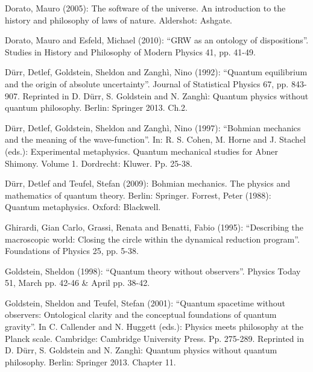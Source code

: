 \documentclass[12pt,a4paper]{article}
\theoremstyle{definition}
\begin{document}
{\vspace{0.3cm}   \noindent  Dorato, Mauro (2005): The software of the universe. An introduction to the history and philosophy of laws of nature. Aldershot: Ashgate. 

\vspace{0.3cm}   \noindent  Dorato, Mauro and Esfeld, Michael (2010): ``GRW as an ontology of dispositions''. Studies in History and Philosophy of Modern Physics 41, pp. 41-49. 

\vspace{0.3cm}   \noindent  D\"urr, Detlef, Goldstein, Sheldon and Zangh\`i, Nino (1992): ``Quantum equilibrium and the origin of absolute uncertainty''. Journal of Statistical Physics 67, pp. 843-907. Reprinted in D. D\"urr, S. Goldstein and N. Zangh\`i: Quantum physics without quantum philosophy. Berlin: Springer 2013. Ch.2.

\vspace{0.3cm}   \noindent  D\"urr, Detlef, Goldstein, Sheldon and Zangh\`i, Nino (1997): ``Bohmian mechanics and the meaning of the wave-function''. In: R. S. Cohen, M. Horne and J. Stachel (eds.): Experimental metaphysics. Quantum mechanical studies for Abner Shimony. Volume 1. Dordrecht: Kluwer. Pp. 25-38. 

\vspace{0.3cm}   \noindent  D\"urr, Detlef and Teufel, Stefan (2009): Bohmian mechanics. The physics and mathematics of quantum theory. Berlin: Springer.
Forrest, Peter (1988): Quantum metaphysics. Oxford: Blackwell.

\vspace{0.3cm}   \noindent  Ghirardi, Gian Carlo, Grassi, Renata and Benatti, Fabio (1995): ``Describing the macroscopic world: Closing the circle within the dynamical reduction program''. Foundations of Physics 25, pp. 5-38.

\vspace{0.3cm}   \noindent  Goldstein, Sheldon (1998): ``Quantum theory without observers''. Physics Today 51, March pp. 42-46 \& April pp. 38-42. 

\vspace{0.3cm}   \noindent  Goldstein, Sheldon and Teufel, Stefan (2001): ``Quantum spacetime without observers: Ontological clarity and the conceptual foundations of quantum gravity''. In C. Callender and N. Huggett (eds.): Physics meets philosophy at the Planck scale. Cambridge: Cambridge University Press. Pp. 275-289. Reprinted in D. D\"urr, S. Goldstein and N. Zangh\`i: Quantum physics without quantum philosophy. Berlin: Springer 2013. Chapter 11.

}
\end{document}
